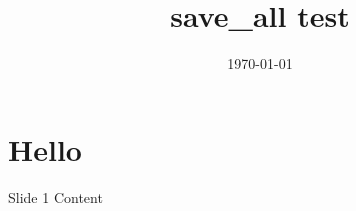 \documentclass{beamer}%
\title{save\_all test}%
\date{\today}%
\begin{document}
%
\pagestyle{empty}%
\normalsize%
\begin{frame}%
\titlepage%
\end{frame}%
\section{Hello}%
\begin{frame}{Slide 1}%
Content%
\par%
\end{frame}%
\end{document}
